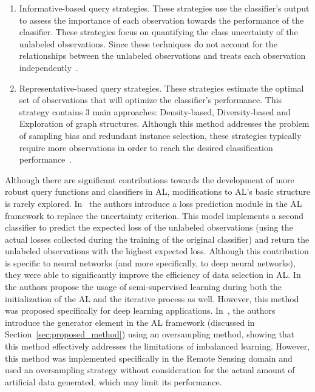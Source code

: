 \documentclass[preprint, 12pt]{elsarticle}
\begin{document}
\begin{enumerate}

    \item Informative-based query strategies. These strategies use the
        classifier's output to assess the importance of each observation
        towards the performance of the classifier. These strategies focus on
        quantifying the class uncertainty of the unlabeled observations.
        Since these techniques do not account for the relationships between
        the unlabeled observations and treats each observation
        independently~\cite{Fu2013}.

    \item Representative-based query strategies. These strategies estimate the
        optimal set of observations that will optimize the classifier's
        performance. This strategy contains 3 main approaches: Density-based,
        Diversity-based and Exploration of graph structures. Although this
        method addresses the problem of sampling bias and redundant instance
        selection, these strategies typically require more observations in
        order to reach the desired classification
        performance~\cite{Kumar2020}.

\end{enumerate}

Although there are significant contributions towards the development of more
robust query functions and classifiers in AL, modifications to AL's basic
structure is rarely explored. In~\cite{Yoo2019} the authors introduce a loss
prediction module in the AL framework to replace the uncertainty criterion.
This model implements a second classifier to predict the expected loss of the
unlabeled observations (using the actual losses collected during the training
of the original classifier) and return the unlabeled observations with the
highest expected loss. Although this contribution is specific to neural
networks (and more specifically, to deep neural networks), they were able to
significantly improve the efficiency of data selection in AL\@.
In~\cite{Simeoni2020} the authors propose the usage of semi-supervised
learning during both the initialization of the AL and the iterative process as
well. However, this method was proposed specifically for deep learning
applications. In~\cite{Fonseca2021}, the authors introduce the generator
element in the AL framework (discussed in Section~\ref{sec:proposed_method})
using an oversampling method, showing that this method effectively addresses
the limitations of imbalanced learning. However, this method was implemented
specifically in the Remote Sensing domain and used an oversampling strategy
without consideration for the actual amount of artificial data generated,
which may limit its performance.
 
\end{document}
